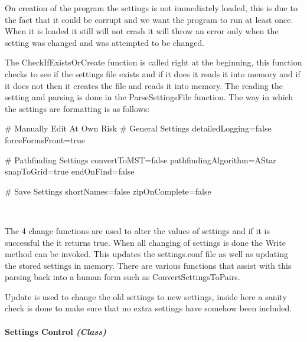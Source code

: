 \begin{FlushLeft}
    On creation of the program the settings is not immediately loaded, this is due to the fact that it could be corrupt and we want the program to run at least once. When it is loaded it still will not crash it will throw an error only when the setting was changed and was attempted to be changed. \\ \bk

    The CheckIfExistsOrCreate function is called right at the beginning, this function checks to see if the settings file exists and if it does it reads it into memory and if it does not then it creates the file and reads it into memory. The reading the setting and parsing is done in the ParseSettingsFile function. The way in which the settings are formatting is as follows:\\ \bk

    \begin{pseudocode}
# Manually Edit At Own Risk
# General Settings
detailedLogging=false
forceFormsFront=true

# Pathfinding Settings
convertToMST=false
pathfindingAlgorithm=AStar
snapToGrid=true
endOnFind=false

# Save Settings
shortNames=false
zipOnComplete=false
    \end{pseudocode}\\\bk

    The 4 change functions are used to alter the values of settings and if it is successful the it returns true. When all changing of settings is done the Write method can be invoked. This updates the settings.conf file as well as updating the stored settings in memory. There are various functions that assist with this parsing back into a human form such as ConvertSettingsToPairs.\\\bk

    Update is used to change the old settings to new settings, inside here a sanity check is done to make sure that no extra settings have somehow been included. \\ \bk

    \bk

    \pagebreak
\paragraph{Settings Control \textit{(Class)}} \mbox{} \\


\end{FlushLeft}
